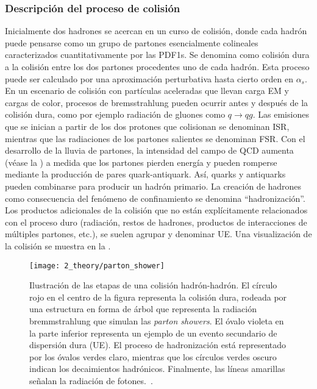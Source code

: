 \subsubsection{Descripción del proceso de colisión}

Inicialmente dos hadrones se acercan en un curso de colisión, donde cada hadrón puede pensarse como un grupo de partones esencialmente colineales caracterizados cuantitativamente por las \acp{PDF1}.
Se denomina como colisión dura a la colisión entre los dos partones procedentes uno de cada hadrón. Esta proceso puede ser calculado por una aproximación perturbativa hasta cierto orden en \(\alpha_s\).%
En un escenario de colisión con partículas aceleradas que llevan carga \ac{EM} y cargas de color, procesos de bremsstrahlung pueden ocurrir antes y después de la colisión dura, como por ejemplo radiación de gluones como \(q \to qg\).
Las emisiones que se inician a partir de los dos protones que colisionan se denominan \ac{ISR}, mientras que las radiaciones de los partones salientes se denominan \ac{FSR}. Con el desarrollo de la lluvia de partones, la intensidad del campo de \ac{QCD} aumenta (véase la \Fig{\ref{fig:theory:sm:mathematical:qcd:alphas}}) a medida que los partones pierden energía y pueden romperse mediante la producción de pares quark-antiquark. Así, quarks y antiquarks pueden combinarse para producir un hadrón primario. La creación de hadrones como consecuencia del fenómeno de confinamiento se denomina \enquote{hadronización}. Los productos adicionales de la colisión que no están explícitamente relacionados con el proceso duro (radiación, restos de hadrones, productos de interacciones de múltiples partones, etc.), se suelen agrupar y denominar \ac{UE}. Una visualización de la colisión \pp se muestra en la \Fig{\ref{fig:theory:sm:hadron_interactions:parton_shower}}.



\begin{figure}[ht!]
    \centering
    \texttt{[image: 2\_theory/parton\_shower]}
    \caption{Ilustración de las etapas de una colisión hadrón-hadrón. El círculo rojo en el centro de la figura representa la colisión dura, rodeada por una estructura en forma de árbol que representa la radiación bremmstrahlung que simulan las \textit{parton showers}. El óvalo violeta en la parte inferior representa un ejemplo de un evento secundario de dispersión dura (\ac{UE}). El proceso de hadronización está representado por los óvalos verdes claro, mientras que los círculos verdes oscuro indican los decaimientos hadrónicos. Finalmente, las líneas amarillas señalan la radiación de fotones.~\cite{Hoche-2015}.}
    \label{fig:theory:sm:hadron_interactions:parton_shower}
\end{figure}



